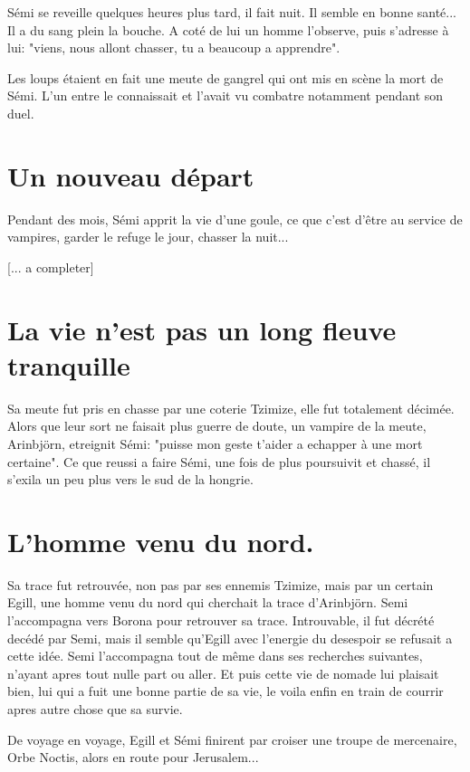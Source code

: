 Sémi se reveille quelques heures plus tard, il fait nuit. Il semble en bonne santé...
Il a du sang plein la bouche. A coté de lui un homme l'observe, puis s'adresse à lui: 
"viens, nous allont chasser, tu a beaucoup a apprendre".

\begin{quotebox}
Les loups étaient en fait une meute de gangrel qui ont mis
en scène la mort de Sémi.
L'un entre le connaissait et l'avait vu combatre notamment pendant son duel.
\end{quotebox}

\section{Un nouveau départ}

Pendant des mois,  Sémi apprit
la vie d'une goule, ce que c'est d'être au service de vampires, garder le refuge le jour,
chasser la nuit... 

[... a completer]

\section{La vie n'est pas un long fleuve tranquille}
Sa meute fut pris en chasse par une coterie Tzimize, elle fut totalement décimée. Alors que leur sort ne faisait plus guerre de doute, un vampire de la meute, Arinbjörn, etreignit Sémi: "puisse mon geste t'aider a echapper à une mort certaine". Ce que reussi a faire Sémi, une fois de plus poursuivit et chassé, il s'exila un peu plus vers le sud de la hongrie.

\section{L'homme venu du nord.}
Sa trace fut retrouvée, non pas par ses ennemis Tzimize, mais par un certain Egill, une homme venu du nord qui cherchait la trace d'Arinbjörn. Semi l'accompagna vers Borona  pour retrouver sa trace. Introuvable, il fut décrété decédé par Semi, mais il semble qu'Egill avec l'energie du desespoir se refusait a cette idée. Semi l'accompagna tout de même dans ses recherches suivantes, n'ayant apres tout nulle part ou aller. Et puis cette vie de nomade lui plaisait bien, lui qui a fuit une bonne partie de sa vie, le voila enfin en train de courrir apres autre chose que sa survie.

De voyage en voyage, Egill et Sémi finirent par croiser une troupe de mercenaire, Orbe Noctis, alors en route pour Jerusalem...

